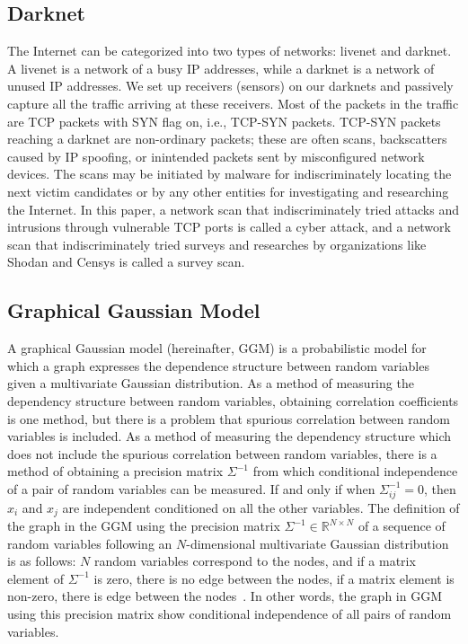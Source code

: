 \documentclass[conference]{IEEEtran}
\begin{document}
\subsection{Darknet}
The Internet can be categorized into two types of networks: livenet and darknet.
A livenet is a network of a busy IP addresses, while a darknet is a network of unused IP addresses.
We set up receivers (sensors) on our darknets and passively capture all the traffic arriving at these receivers.
Most of the packets in the traffic are TCP packets with SYN flag on, i.e., TCP-SYN packets.
TCP-SYN packets reaching a darknet are non-ordinary packets; these are often scans, backscatters caused by IP spoofing, or inintended packets sent by misconfigured network devices.
The scans may be initiated by malware for indiscriminately locating the next victim candidates or by any other entities for investigating and researching the Internet.
In this paper, a network scan that indiscriminately tried attacks and intrusions through vulnerable TCP ports is called a cyber attack, and a network scan that indiscriminately tried surveys and researches by organizations like Shodan and Censys is called a survey scan.



\subsection{Graphical Gaussian Model}
A graphical Gaussian model (hereinafter, GGM) is a probabilistic model for which a graph expresses the dependence structure between random variables given a multivariate Gaussian distribution.
As a method of measuring the dependency structure between random variables, obtaining correlation coefficients is one method, but there is a problem that spurious correlation between random variables is included.
As a method of measuring the dependency structure which does not include the spurious correlation between random variables, there is a method of obtaining a precision matrix $\Sigma^{-1}$ from which conditional independence of a pair of random variables can be measured.
If and only if when $\Sigma^{-1}_{ij}=0$, then $x_ {i}$ and $x_ {j}$ are independent conditioned on all the other variables.
The definition of the graph in the GGM using the precision matrix $\Sigma^{-1}\in\mathbb{R}^{N \times N}$ of a sequence of random variables following an $N$-dimensional multivariate Gaussian distribution is as follows: $N$ random variables correspond to the nodes, and if a matrix element of $\Sigma^{-1}$ is zero, there is no edge between the nodes, if a matrix element is non-zero, there is edge between the nodes~\cite{Ide}.
In other words, the graph in GGM using this precision matrix show conditional independence of all pairs of random variables.
\end{document}
